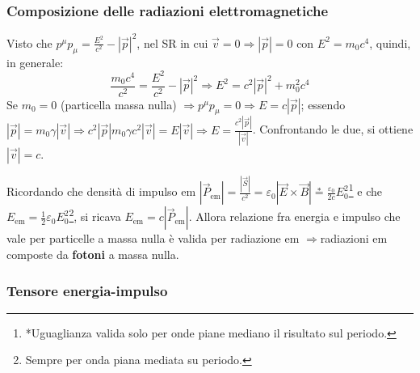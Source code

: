 \documentclass[10pt, a4paper]{scrartcl}
\numberwithin{equation}{subsection}
\theoremstyle{style1}
\begin{document}
\subsubsection{Composizione delle radiazioni elettromagnetiche}
Visto che $p^\mu  p_\mu  = \frac{E^2}{c^2}-\left\lvert \vec{p} \right\rvert ^2$, nel SR in cui $\vec{v}=0\Rightarrow \left\lvert \vec{p} \right\rvert =0 $ con $E ^2 = m_0c^4$, quindi, in generale:
\begin{equation}
	\frac{m_0 c^4}{c^2} = \frac{E^2}{c^2}-\left\lvert \vec{p} \right\rvert ^2 \Rightarrow E^2 = c^2 \left\lvert \vec{p} \right\rvert ^2 + m_0^2 c^4
\end{equation}
Se $m_0 =0 $ (particella massa nulla) $\Rightarrow p^\mu p_\mu = 0 \Rightarrow E = c\left\lvert \vec{p} \right\rvert$; essendo $\left\lvert \vec{p} \right\rvert= m_0\gamma \left\lvert \vec{v} \right\rvert \Rightarrow c^2 \left\lvert \vec{p} \right\rvert m_0\gamma c^2 \left\lvert \vec{v }  \right\rvert = E\left\lvert \vec{v} \right\rvert  \Rightarrow E = \frac{c^2 \left\lvert \vec{p} \right\rvert }{\left\lvert \vec{v} \right\rvert }$. Confrontando le due, si ottiene $\left\lvert \vec{v} \right\rvert =c$.

Ricordando che densit\`a di impulso em $\left\lvert \vec{P}_\text{em} \right\rvert = \frac{\left\lvert \vec{S} \right\rvert }{c^2}=\varepsilon _0 \left\lvert \vec{E}\times \vec{B} \right\rvert \stackrel{*}{=} \frac{\varepsilon _0}{2c}E_0^2$\footnote{*Uguaglianza valida solo per onde piane mediano il risultato sul periodo.}  e che $E_\text{em}=\frac{1}{2}\varepsilon _0 E_0^2$\footnote{Sempre per onda piana mediata su periodo.}, si ricava $E_\text{em}= c \left\lvert \vec{P}_\text{em} \right\rvert $. Allora relazione fra energia e impulso che vale per particelle a massa nulla \`e valida per radiazione em $\Rightarrow $radiazioni em composte da \textbf{fotoni} a massa nulla.

\subsubsection{Tensore energia-impulso}
\end{document}
